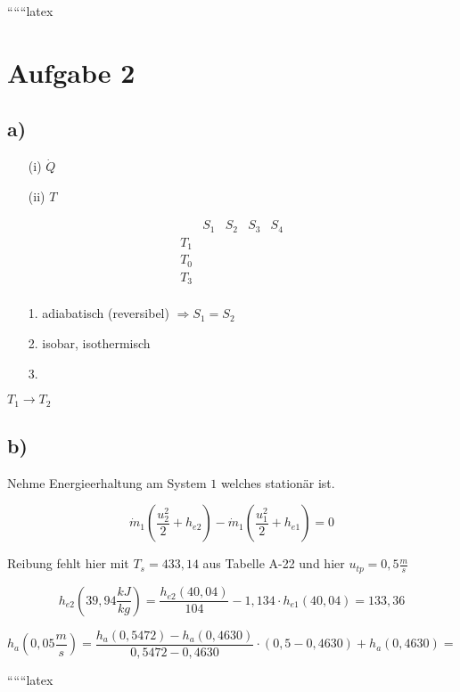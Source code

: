 
``````latex


\section*{Aufgabe 2}

\subsection*{a)}

\begin{itemize}
    \item[(i)] \(\dot{Q}\)
    \item[(ii)] \(T\)
\end{itemize}

\[
\begin{array}{c|c|c|c|c}
    & S_1 & S_2 & S_3 & S_4 \\
    \hline
    T_1 & & & & \\
    T_0 & & & & \\
    T_3 & & & & \\
\end{array}
\]

\begin{itemize}
    \item[1.] adiabatisch (reversibel) \(\Rightarrow S_1 = S_2\)
    \item[2.] isobar, isothermisch
    \item[3.] 
\end{itemize}

\(T_1 \rightarrow T_2\)

\subsection*{b)}

Nehme Energieerhaltung am System \(1\) welches stationär ist.

\[
\dot{m}_1 \left( \frac{u_2^2}{2} + h_{e2} \right) - \dot{m}_1 \left( \frac{u_1^2}{2} + h_{e1} \right) = 0
\]

Reibung fehlt hier mit \(T_s = 433,14\) aus Tabelle A-22 und hier \(u_{tp} = 0,5 \frac{m}{s}\)

\[
h_{e2}(39,94 \frac{kJ}{kg}) = \frac{h_{e2}(40,04)}{104} - 1,134 \cdot h_{e1}(40,04) = 133,36
\]

\[
h_{a}(0,05 \frac{m}{s}) = \frac{h_{a}(0,5472) - h_{a}(0,4630)}{0,5472 - 0,4630} \cdot (0,5 - 0,4630) + h_{a}(0,4630) =
\]

``````latex


